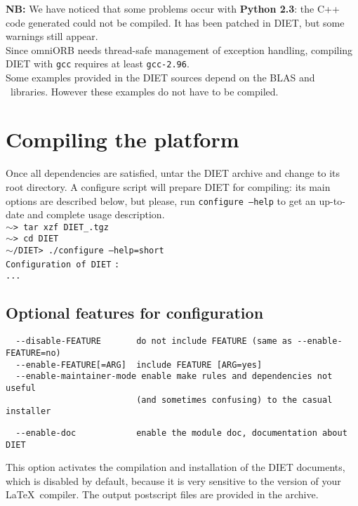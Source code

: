 \noindent 
\textbf{NB:} We have noticed that some problems occur with
\textbf{Python 2.3}: the C++ code generated could not be compiled. It
has been patched in DIET, but some warnings still appear.  \\

Since omniORB needs thread-safe management of exception handling,
compiling DIET with \verb+gcc+ requires at least \verb+gcc-2.96+.  \\

Some examples provided in the DIET sources depend on the BLAS
and \scalapack\ libraries. However these examples do not have to be
compiled.


\section{Compiling the platform}
\label{sec:compil_platform}

Once all dependencies are satisfied, untar the DIET archive and change
to its root directory. A configure script will prepare DIET for
compiling: its main options are described below, but please, run
\texttt{configure --help} to get an up-to-date and complete usage
description.\\

\noindent
{\footnotesize
\texttt{$\sim$> tar xzf DIET\_}\dietversion\texttt{.tgz} \\
\texttt{$\sim$> cd DIET} \\
\texttt{$\sim$/DIET> ./configure --help=short} \\
\texttt{Configuration of DIET} \dietversion \texttt{:} \\
\texttt{...}
}

\subsection{Optional features for configuration}

{\footnotesize
\begin{verbatim}
  --disable-FEATURE       do not include FEATURE (same as --enable-FEATURE=no)
  --enable-FEATURE[=ARG]  include FEATURE [ARG=yes]
  --enable-maintainer-mode enable make rules and dependencies not useful
                          (and sometimes confusing) to the casual installer
\end{verbatim}

\begin{verbatim}
  --enable-doc            enable the module doc, documentation about DIET
\end{verbatim}
}
\noindent This option activates the compilation and installation of
the DIET documents, which is disabled by default, because it is very
sensitive to the version of your \LaTeX\ compiler. The output
postscript files are provided in the archive.

